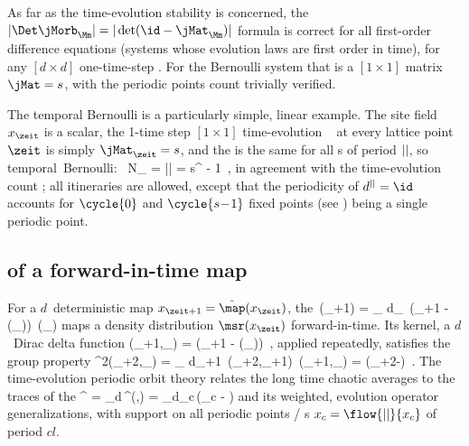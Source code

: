 As far as the time-evolution stability is concerned, the
$|\Det\jMorb_\Mm|=|\det (\id-\jMat_\Mm)|$ formula  is
correct for all first-order difference equations (systems whose evolution
laws are first order in time), for any $[d\times{d}]$ one-time-step
{\jacobianM}. For the Bernoulli system that is a $[1\!\times\!1]$ matrix
$\jMat=s$, with the periodic points count  trivially
verified.

The temporal {Bernoulli}  is a particularly simple, linear  example.
The site field $\ssp_\zeit$ is a scalar,
the 1-time step $[1\!\times\!1]$ time-evolution \jacobianM\
 at every lattice point $\zeit$ is simply
$\jMat_{\zeit}={s}$,
and
the {\jacobianOrb}
 is the same for all {\lattstate}s of period ${||}$,
so
\beq
\mbox{temporal {Bernoulli}: }\quad
N_\cl{} = |\Det\jMorb| = {s}^{\cl{}} - 1
\,,
in agreement with the time-evolution count ; all
itineraries are allowed, except that the periodicity of
$\shift^\cl{}=\id$ accounts for $\cycle{0}$ and
$\cycle{s\!-\!1}$ fixed points (see ) being a
single periodic point.



\subsection{{\HillDet} of a for\-ward-in-time map}
\label{s:LC21forwardHill}

For a $d$\dmn\ deterministic map $\ssp_{\zeit+1} = \hat{\map}(\ssp_{\zeit})$, the
{\FPoper}
\beq
     \Lop\,\msr(\ssp_{\zeit+1})
= \int_\pS\!\! d\ssp_{\zeit}\,
           \delta(\ssp_{\zeit+1} - \hat{\map}(\ssp_{\zeit}))\,
           \msr(\ssp_{\zeit})
maps a density distribution $\msr(\ssp_{\zeit})$ for\-ward-in-time.
Its kernel, a $d$\dmn\ Dirac delta function
\bea
\Lop(\ssp_{\zeit+1},\ssp_{\zeit})
    = \delta(\ssp_{\zeit+1} - \hat{\map}(\ssp_{\zeit}))
\,,
\eea
applied repeatedly, satisfies the group property
\beq
\Lop^2(\ssp_{\zeit+2},\ssp_{\zeit})
    = \int_\pS\!\! d\ssp_{\zeit+1}\,
            \Lop(\ssp_{\zeit+2},\ssp_{\zeit+1})\,
            \Lop(\ssp_{\zeit+1},\ssp_{\zeit})
    = \delta(\ssp_{\zeit+2}-)
\,.
The time-evolution periodic orbit theory relates the
long time chaotic averages to the traces of the {\FPoper}
\beq
\tr\Lop^\cl{}
     = \int_\pS\!\!d\ssp\,\Lop^\cl{}(\ssp,\ssp)
     = \int_\pS\!\!d\ssp_{c}\,\delta(\ssp_{c} - )
\eeq
and its weighted, evolution operator generalizations, with support on all
periodic points / {\lattstate}s   $\ssp_{c}=\flow{\cl{}}{\ssp_c}$ of
period $cl{}$.

